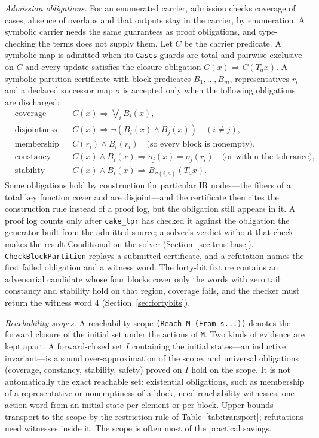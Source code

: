 \documentclass[11pt]{article}
\newcommand{\code}[1]{\texttt{#1}}
\theoremstyle{definition}
\theoremstyle{plain}
\begin{document}
\emph{Admission obligations.} For an enumerated carrier, admission checks coverage of cases,
absence of overlaps and that outputs stay in the carrier, by enumeration. A symbolic carrier needs
the same guarantees as proof obligations, and type-checking the terms does not supply them. Let
$C$ be the carrier predicate. A symbolic map is admitted when its \code{Cases} guards are total and
pairwise exclusive on $C$ and every update satisfies the closure obligation
$C(x)\Rightarrow C(T_ax)$. A symbolic partition certificate with block predicates $B_1,\dots,B_m$,
representatives $r_i$ and a declared successor map $\sigma$ is accepted only when the following
obligations are discharged:
\begin{align*}
&\text{coverage} && C(x)\Rightarrow\textstyle\bigvee_iB_i(x),\\
&\text{disjointness} && C(x)\Rightarrow\neg(B_i(x)\wedge B_j(x))\quad(i\ne j),\\
&\text{membership} && C(r_i)\wedge B_i(r_i)\quad\text{(so every block is nonempty)},\\
&\text{constancy} && C(x)\wedge B_i(x)\Rightarrow o_j(x)=o_j(r_i)\quad\text{(or within the tolerance)},\\
&\text{stability} && C(x)\wedge B_i(x)\Rightarrow B_{\sigma(i,a)}(T_ax).
\end{align*}
Some obligations hold by construction for particular IR nodes---the fibers of a total key function
cover and are disjoint---and the certificate then cites the construction rule instead of a proof
log, but the obligation still appears in it. A proof log counts only after \code{cake\_lpr} has
checked it against the obligation the generator built from the admitted source; a solver's verdict
without that check makes the result Conditional on the solver (Section~\ref{sec:trustbase}). \code{CheckBlockPartition} replays a submitted
certificate, and a refutation names the first failed obligation and a witness word. The forty-bit
fixture contains an adversarial candidate whose four blocks cover only the words with zero tail:
constancy and stability hold on that region, coverage fails, and the checker must return the
witness word $4$ (Section~\ref{sec:fortybits}).

\emph{Reachability scopes.} A reachability scope \code{(Reach M (From s...))} denotes the forward
closure of the initial set under the actions of \code{M}. Two kinds of evidence are kept apart. A
forward-closed set $I$ containing the initial states---an inductive invariant---is a sound
over-approximation of the scope, and universal obligations (coverage, constancy, stability,
safety) proved on $I$ hold on the scope. It is not automatically the exact reachable set:
existential obligations, such as membership of a representative or nonemptiness of a block, need
reachability witnesses, one action word from an initial state per element or per block. Upper
bounds transport to the scope by the restriction rule of Table~\ref{tab:transport}; refutations
need witnesses inside it. The scope is often most of the practical savings.
\end{document}
